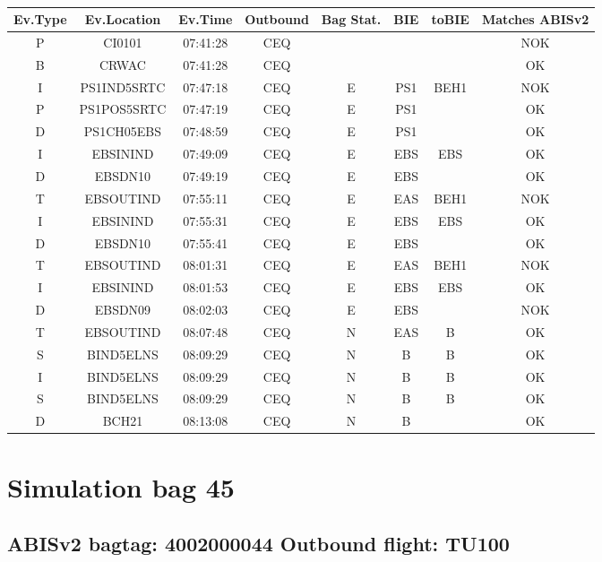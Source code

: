 \documentclass{report}
\begin{document}
\paragraph{}
\begin{longtable}{cccccccc}    \toprule
\rowcolor{white!50}
\textbf{Ev.Type} & \textbf{Ev.Location} & \textbf{Ev.Time} & \textbf{Outbound} & \textbf{Bag Stat.} & \textbf{BIE} & \textbf{toBIE} & \textbf{Matches ABISv2} \\\midrule
P & CI0101 & 07:41:28  & CEQ &  &  &  & NOK\\
B & CRWAC & 07:41:28  & CEQ &  &  &  & OK\\
I & PS1IND5SRTC & 07:47:18  & CEQ & E & PS1 & BEH1 & NOK\\
P & PS1POS5SRTC & 07:47:19  & CEQ & E & PS1 &  & OK\\
D & PS1CH05EBS & 07:48:59  & CEQ & E & PS1 &  & OK\\
I & EBSININD & 07:49:09  & CEQ & E & EBS & EBS & OK\\
D & EBSDN10 & 07:49:19  & CEQ & E & EBS &  & OK\\
T & EBSOUTIND & 07:55:11  & CEQ & E & EAS & BEH1 & NOK\\
I & EBSININD & 07:55:31  & CEQ & E & EBS & EBS & OK\\
D & EBSDN10 & 07:55:41  & CEQ & E & EBS &  & OK\\
T & EBSOUTIND & 08:01:31  & CEQ & E & EAS & BEH1 & NOK\\
I & EBSININD & 08:01:53  & CEQ & E & EBS & EBS & OK\\
D & EBSDN09 & 08:02:03  & CEQ & E & EBS &  & NOK\\
T & EBSOUTIND & 08:07:48  & CEQ & N & EAS & B & OK\\
S & BIND5ELNS & 08:09:29  & CEQ & N & B & B & OK\\
I & BIND5ELNS & 08:09:29  & CEQ & N & B & B & OK\\
S & BIND5ELNS & 08:09:29  & CEQ & N & B & B & OK\\
D & BCH21 & 08:13:08  & CEQ & N & B &  & OK\\
\bottomrule
\end{longtable}
\pagebreak
\section*{Simulation bag 45}
\subsection*{ABISv2 bagtag: 4002000044 Outbound flight: TU100}
\end{document}
